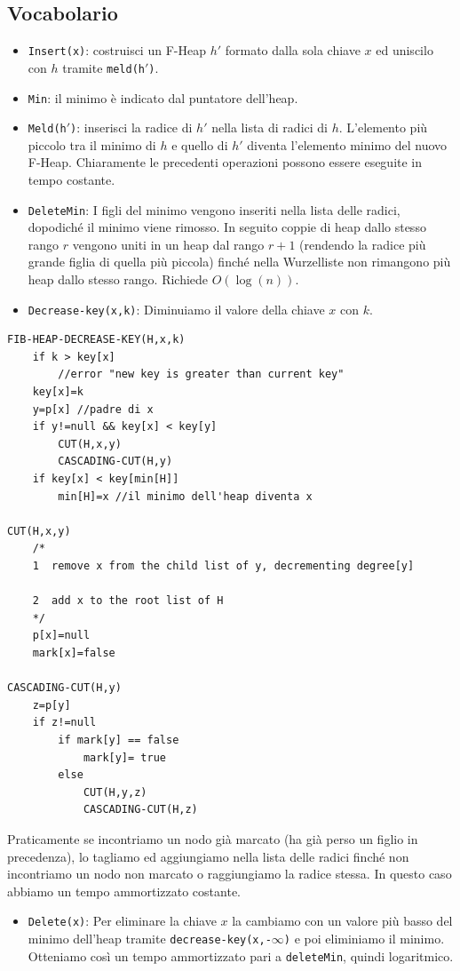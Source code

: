 \documentclass[a4paper]{book}
\newcommand{\inline}[1]{\lstinline!#1!}%
\newcommand{\lstIndent}{4}
\begin{document}
\subsection*{Vocabolario}
\begin{itemize}
\item \inline{Insert(x)}: costruisci un F-Heap $h'$ formato dalla sola chiave $x$ ed uniscilo con $h$ tramite \inline{meld(h}$'$\inline{)}.
\item\inline{Min}: il minimo è indicato dal puntatore dell'heap.
\item\inline{Meld(h}${}'$\inline{)}: inserisci la radice di $h'$ nella lista di radici di $h$. L'elemento più piccolo tra il minimo di $h$ e quello di $h'$ diventa l'elemento minimo del nuovo F-Heap. Chiaramente le precedenti operazioni possono essere eseguite in tempo costante. 
\item \inline{DeleteMin}: I figli del minimo vengono inseriti nella lista delle radici, dopodiché il minimo viene rimosso. In seguito coppie di heap dallo stesso rango $r$ vengono uniti in un heap dal rango $r+1$ (rendendo la radice più grande figlia di quella più piccola) finché nella Wurzelliste non rimangono più heap dallo stesso rango. Richiede $O(\log(n))$.
\item\inline{Decrease-key(x,k)}: Diminuiamo il valore della chiave $x$ con $k$.
\end{itemize}
\begin{lstlisting}[tabsize=\lstIndent]
FIB-HEAP-DECREASE-KEY(H,x,k) 
	if k > key[x]
		//error "new key is greater than current key"
	key[x]=k
	y=p[x] //padre di x
	if y!=null && key[x] < key[y]
		CUT(H,x,y)
		CASCADING-CUT(H,y)
	if key[x] < key[min[H]]
		min[H]=x //il minimo dell'heap diventa x

CUT(H,x,y)
	/*
	1  remove x from the child list of y, decrementing degree[y]

	2  add x to the root list of H
	*/
	p[x]=null
	mark[x]=false

CASCADING-CUT(H,y)
	z=p[y]
	if z!=null
		if mark[y] == false
			mark[y]= true
		else 
			CUT(H,y,z)
			CASCADING-CUT(H,z)
\end{lstlisting}
Praticamente se incontriamo un nodo già marcato (ha già perso un figlio in precedenza), lo tagliamo ed aggiungiamo nella lista delle radici finché non incontriamo un nodo non marcato o raggiungiamo la radice stessa. In questo caso abbiamo un tempo ammortizzato costante.
\begin{itemize}
\item \inline{Delete(x)}: Per eliminare la chiave $x$ la cambiamo con un valore più basso del minimo dell'heap tramite \inline{decrease-key(x,-}$\infty$\inline{)} e poi eliminiamo il minimo. Otteniamo così un tempo ammortizzato pari a \inline{deleteMin}, quindi logaritmico.
\end{itemize}
\end{document}
